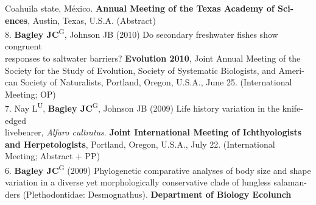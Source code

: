 \documentclass[margin,line]{res}
\begin{document}
\begin{resume}
\hspace*{8mm} Coahuila state, M\'{e}xico. \textbf{Annual Meeting of the Texas Academy of Sci-}\\ \vspace{2mm}
\hspace*{8mm}\textbf{ences}, Austin, Texas, U.S.A. (Abstract) \\
8. \textbf{Bagley JC}\textsuperscript{G}, Johnson JB (2010) Do secondary freshwater fishes show congruent\\
\hspace*{8mm} responses to saltwater barriers? \textbf{Evolution 2010}, Joint Annual Meeting of the\\ 
\hspace*{8mm} Society for the Study of Evolution, Society of Systematic Biologists, and Ameri-\\
\hspace*{8mm} can Society of Naturalists, Portland, Oregon, U.S.A., June 25. (International\\ \vspace{2mm}
\hspace*{8mm}Meeting; OP) \\
7. Nay L\textsuperscript{U}, \textbf{Bagley JC}\textsuperscript{G}, Johnson JB (2009) Life history variation in the knife-edged\\
\hspace*{8mm} livebearer, \emph{Alfaro cultratus}. \textbf{Joint International Meeting of Ichthyologists}\\
\hspace*{8mm} \textbf{and Herpetologists}, Portland, Oregon, U.S.A., July 22. (International\\ \vspace{2mm}
\hspace*{8mm}Meeting; Abstract + PP) \\
6. \textbf{Bagley JC}\textsuperscript{G} (2009) Phylogenetic comparative analyses of body size and shape\\
\hspace*{8mm} variation in a diverse yet morphologically conservative clade of lungless salaman-\\
\hspace*{8mm} ders (Plethodontidae: Desmognathus). \textbf{Department of Biology Ecolunch}\\ \vspace{2mm}

\end{resume}
\end{document}
